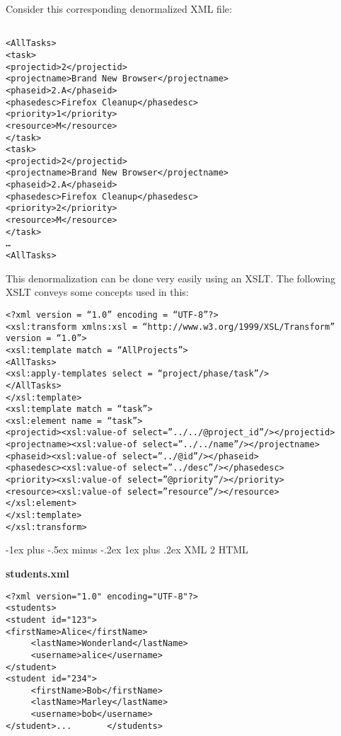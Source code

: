 \documentclass[10pt,landscape]{article}
\makeatletter
\renewcommand{\subsubsection}{\@startsection{subsubsection}{3}{0mm}%
                                {-1ex plus -.5ex minus -.2ex}%
                                {1ex plus .2ex}%
                                {\normalfont\small\bfseries}}
\makeatother
\begin{document}
\begin{multicols}{3}
Consider this corresponding denormalized XML file:
\begin{lstlisting}

<AllTasks>
<task>
<projectid>2</projectid>
<projectname>Brand New Browser</projectname>
<phaseid>2.A</phaseid>
<phasedesc>Firefox Cleanup</phasedesc>
<priority>1</priority>
<resource>M</resource>
</task>
<task>
<projectid>2</projectid>
<projectname>Brand New Browser</projectname>
<phaseid>2.A</phaseid>
<phasedesc>Firefox Cleanup</phasedesc>
<priority>2</priority>
<resource>M</resource>
</task>
…
<AllTasks>

\end{lstlisting}


This denormalization can be done very easily using an XSLT. The following XSLT conveys some concepts used in this:


\begin{lstlisting}
<?xml version = “1.0” encoding = “UTF-8”?>
<xsl:transform xmlns:xsl = “http://www.w3.org/1999/XSL/Transform” version = “1.0”>
<xsl:template match = “AllProjects”>
<AllTasks>
<xsl:apply-templates select = “project/phase/task”/>
</AllTasks>
</xsl:template>
<xsl:template match = “task”>
<xsl:element name = “task”>
<projectid><xsl:value-of select=”../../@project_id”/></projectid>
<projectname><xsl:value-of select=”../../name”/></projectname>
<phaseid><xsl:value-of select=”../@id”/></phaseid>
<phasedesc><xsl:value-of select=”../desc”/></phasedesc>
<priority><xsl:value-of select=”@priority”/></priority>
<resource><xsl:value-of select=”resource”/></resource>
</xsl:element>
</xsl:template>
</xsl:transform>
\end{lstlisting}







\subsubsection{XML 2 HTML}

\textbf{students.xml}
\begin{lstlisting}
<?xml version="1.0" encoding="UTF-8"?>
<students>
<student id="123">
<firstName>Alice</firstName>
     <lastName>Wonderland</lastName>
     <username>alice</username>
</student>
<student id="234">
     <firstName>Bob</firstName>
     <lastName>Marley</lastName>
     <username>bob</username>
</student>...		</students>
\end{lstlisting}



\end{multicols}
\end{document}
